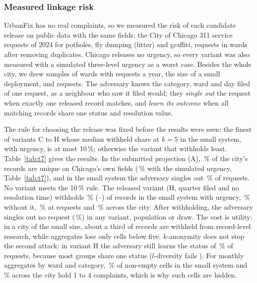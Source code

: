 \documentclass{ieeeaccess}
\begin{document}
\subsubsection{Measured linkage risk}
UrbanFix has no real complaints, so we measured the risk of each candidate release on public data with the same fields: the City of Chicago 311 service requests of 2024 for potholes, fly dumping (litter) and graffiti, \nChiRows{} requests in \nChiWards{} wards after removing \nChiDuplicates{} duplicates. Chicago releases no urgency, so every variant was also measured with a simulated three-level urgency as a worst case. Besides the whole city, we drew \nChiDraws{} samples of \nChiSampleWards{} wards with \nChiSmall{} requests a year, the size of a small deployment, and \nChiMedium{} requests. The adversary knows the category, ward and day filed of one request, as a neighbour who saw it filed would; they \emph{single out} the request when exactly one released record matches, and \emph{learn its outcome} when all matching records share one status and resolution value.

The rule for choosing the release was fixed before the results were seen: the finest of variants C to H whose median withheld share at $k=5$ in the small system, with urgency, is at most 10\,\%; otherwise the variant that withholds least. Table~\ref{tab:t7} gives the results. In the submitted projection (A), \nChiCityKOneA\,\% of the city's records are unique on Chicago's own fields (\nChiCityKOneUrgA\,\% with the simulated urgency, Table~\ref{tab:t7}), and in the small system the adversary singles out \nChiSmallSingledA\,\% of requests. No variant meets the 10\,\% rule. The released variant (H, quarter filed and no resolution time) withholds \nChiSmallWithUrgencyHWithheld\,\% (\nChiHWithheldLo--\nChiHWithheldHi) of records in the small system with urgency, \nChiSmallWithoutUrgencyHWithheld\,\% without it, \nChiMediumWithUrgencyHWithheld\,\% at \nChiMedium{} requests and \nChiCityWithUrgencyHWithheld\,\% across the city. After withholding, the adversary singles out no request (\nChiAfterMax\,\%) in any variant, population or draw. The cost is utility: in a city of the small size, about a third of records are withheld from record-level research, while aggregates lose only cells below five. $k$-anonymity does not stop the second attack: in variant H the adversary still learns the status of \nChiSmallLearnsAfterH\,\% of requests, because most groups share one status ($l$-diversity fails \cite{b41}). For monthly aggregates by ward and category, \nChiCellsSmall\,\% of non-empty cells in the small system and \nChiCellsCity\,\% across the city hold 1 to 4 complaints, which is why such cells are hidden.
\end{document}
